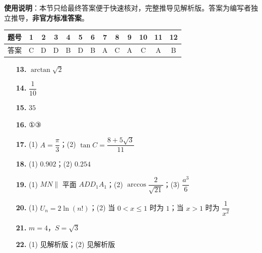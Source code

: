 
\begin{gknotice}
\textbf{使用说明}：本节只给最终答案便于快速核对，完整推导见解析版。答案为编写者独立推导，\textbf{非官方标准答案}。
\end{gknotice}

\begin{center}\begin{tabular}{ccccccccccccc}
\toprule
题号 & 1 & 2 & 3 & 4 & 5 & 6 & 7 & 8 & 9 & 10 & 11 & 12 \\
\midrule
答案 & C & D & D & B & D & B & A & C & A & C & A & B \\
\bottomrule
\end{tabular}\end{center}

\begin{itemize}[leftmargin=2.6em]
  \item[\textbf{13.}] $\arctan\sqrt2$
  \item[\textbf{14.}] $\dfrac1{10}$
  \item[\textbf{15.}] $35$
  \item[\textbf{16.}] ①③
\end{itemize}

\begin{itemize}[leftmargin=2.6em]
  \item[\textbf{17.}] (1) $A=\dfrac\pi3$；(2) $\tan C=\dfrac{8+5\sqrt3}{11}$
  \item[\textbf{18.}] (1) $0.902$；(2) $0.254$
  \item[\textbf{19.}] (1) $MN\parallel$ 平面 $ADD_1A_1$；(2) $\arccos\dfrac2{\sqrt{21}}$；(3) $\dfrac{a^3}{6}$
  \item[\textbf{20.}] (1) $U_n=2\ln(n!)$；(2) 当 $0<x\leqslant1$ 时为 $1$；当 $x>1$ 时为 $\dfrac1{x^2}$
  \item[\textbf{21.}] $m=4\text{，}S=\sqrt3$
  \item[\textbf{22.}] (1) 见解析版；(2) 见解析版
\end{itemize}
